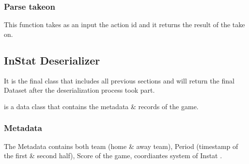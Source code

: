 \documentclass[letterpaper,10pt,english]{jupyterBook}
\begin{document}
\subsubsection{Parse take\sphinxhyphen{}on}
\label{\detokenize{Chap1/section3:parse-take-on}}
\sphinxAtStartPar
This function takes as an input the action id and it returns the result of the take on.

\begin{sphinxVerbatim}[commandchars=\\\{\}]
    
       
          
       
          
     
\end{sphinxVerbatim}


\subsection{InStat Deserializer}
\label{\detokenize{Chap1/section3:instat-deserializer}}
\sphinxAtStartPar
It is the final class that includes all previous sections and will return the final Dataset after the de\sphinxhyphen{}serialization process took part.

\begin{sphinxVerbatim}[commandchars=\\\{\}]
 
\end{sphinxVerbatim}

\sphinxAtStartPar
{} is a data class that contains the metadata \& records of the game.


\subsubsection{Metadata}
\label{\detokenize{Chap1/section3:metadata}}
\sphinxAtStartPar
The Metadata contains both team (home \& away team), Period (timestamp of the first \& second half), Score of the game, coordiantes system of Instat .
\end{document}
